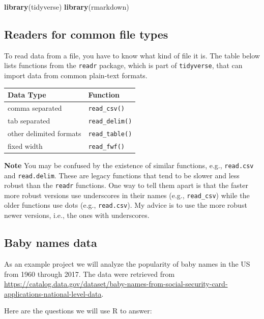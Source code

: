 \documentclass[]{book}
\newenvironment{Shaded}{\begin{snugshade}}{\end{snugshade}}
\newcommand{\KeywordTok}[1]{\textcolor[rgb]{0.13,0.29,0.53}{\textbf{#1}}}
\newcommand{\NormalTok}[1]{#1}
\begin{document}
\begin{Shaded}
\begin{Highlighting}[]
\KeywordTok{library}\NormalTok{(tidyverse)}
\KeywordTok{library}\NormalTok{(rmarkdown)}
\end{Highlighting}
\end{Shaded}

\hypertarget{readers-for-common-file-types}{%
\subsection{Readers for common file types}\label{readers-for-common-file-types}}

To read data from a file, you have to know what kind of file
it is. The table below lists functions from the \texttt{readr} package, which
is part of \texttt{tidyverse}, that can import data from common plain-text formats.

\begin{longtable}[]{@{}ll@{}}
\toprule
Data Type & Function\tabularnewline
\midrule
\endhead
comma separated & \texttt{read\_csv()}\tabularnewline
tab separated & \texttt{read\_delim()}\tabularnewline
other delimited formats & \texttt{read\_table()}\tabularnewline
fixed width & \texttt{read\_fwf()}\tabularnewline
\bottomrule
\end{longtable}

\textbf{Note} You may be confused by the existence of similar functions,
e.g., \texttt{read.csv} and \texttt{read.delim}. These are legacy functions that
tend to be slower and less robust than the \texttt{readr} functions. One way
to tell them apart is that the faster more robust versions use
underscores in their names (e.g., \texttt{read\_csv}) while the older
functions use dots (e.g., \texttt{read.csv}). My advice is to use the more
robust newer versions, i.e., the ones with underscores.

\hypertarget{baby-names-data}{%
\subsection{Baby names data}\label{baby-names-data}}

As an example project we will analyze the popularity of baby names in the US from 1960 through 2017. The data were retrieved from
\url{https://catalog.data.gov/dataset/baby-names-from-social-security-card-applications-national-level-data}.

Here are the questions we will use R to answer:
\end{document}
